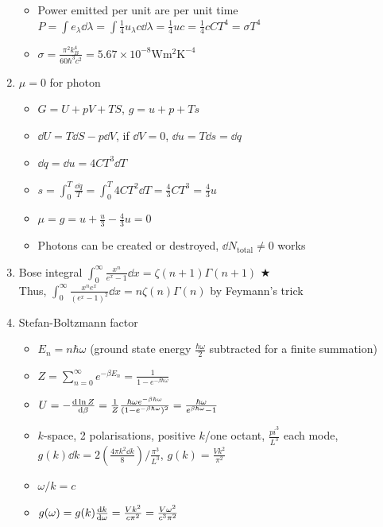 \documentclass{article}
\theoremstyle{remark}
\newcommand{\mylabel}[2]{\hyperref[#1]{#2}\label{back:#1}}
\begin{document}
\begin{enumerate}
\begin{itemize}
            \item Power emitted per unit are per unit time \\ $P=\int e_\lambda\dd\lambda=\int\frac{1}{4}u_\lambda c\dd\lambda=\frac{1}{4}uc=\frac{1}{4}cCT^4=\sigma T^4$            \item $\sigma=\frac{\pi^2k_B^4}{60\hbar^3c^2}=5.67\times10^{-8}\mathrm{Wm^2K^{-4}}$
        \end{itemize}
    \item $\mu=0$ for photon\begin{itemize}
            \item $G=U+pV+TS$, $g=u+p+Ts$
            \item $\dd U=T\dd S-p\dd V$, if $\dd V=0$, $\dd u=T\dd s=\dd q$
            \item $\dd q = \dd u=4CT^3\dd T$
            \item $s=\int_0^T\frac{\dd q}{T}=\int_0^T 4CT^2\dd T=\frac{4}{3}CT^3=\frac{4}{3}u$
            \item $\mu=g=u+\frac{u}{3}-\frac{4}{3}u = 0$
            \item Photons can be created or destroyed, $\dd N_{\text{total}}\neq 0$ works
        \end{itemize}
    \item Bose integral $\int_0^\infty \frac{x^n}{e^x-1}\dd x=\zeta(n+1)\Gamma(n+1)$ \mylabel{bose_integral}{$\bigstar$}\\
            Thus, $\int_0^\infty\frac{x^ne^x}{(e^x-1)^2}\dd x=n\zeta(n)\Gamma(n)$ by Feymann's trick
    \item Stefan-Boltzmann factor\begin{itemize}
            \item $E_n=n\hbar\omega$ (ground state energy $\frac{\hbar\omega}{2}$ subtracted for a finite summation)
            \item $Z=\sum_{n=0}^\infty e^{-\beta E_n}=\frac{1}{1-e^{-\beta\hbar\omega}}$
            \item $U=-\dv{\ln Z}{\beta}=\frac{1}{Z}\frac{\hbar\omega e^{-\beta\hbar\omega}}{(1-e^{-\beta\hbar\omega})^2}=\frac{\hbar\omega}{e^{\beta\hbar\omega}-1}$
            \item $k$-space, 2 polarisations, positive $k$/one octant, $\frac{pi^3}{L^3}$ each mode, $g(k)\dd k=2\left(\frac{4\pi k^2\dd k}{8}\right)/\frac{\pi^3}{L^3}$, $g(k)=\frac{Vk^2}{\pi^2}$
            \item $\omega/k=c$
            \item $g(\omega)=g(k)\dv{k}{\omega}=\frac{Vk^2}{c\pi^2}=\frac{V\omega^2}{c^3\pi^2}$

\end{itemize}
\end{enumerate}
\end{document}

